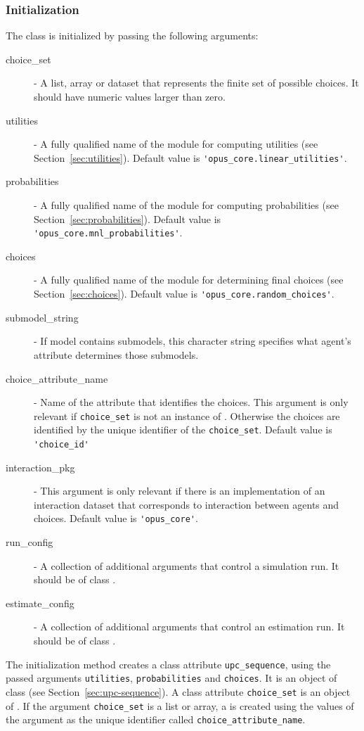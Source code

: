 {\subsubsection{Initialization}
%
The class is initialized by passing the following arguments:
\begin{description}
\item[choice_set] - A list, array or dataset \datasetindex that represents the finite set of
  possible choices. It should have numeric values larger than zero.
\item[utilities] - A fully qualified name of the module for computing utilities
  (see Section~\ref{sec:utilities}). Default value is
  \verb|'opus_core.linear_utilities'|.
\item[probabilities] - A fully qualified name of the module for computing
  probabilities (see Section~\ref{sec:probabilities}). Default value is
  \verb|'opus_core.mnl_probabilities'|.
\item[choices] - A fully qualified name of the module for determining
  final choices (see Section~\ref{sec:choices}). Default value is
  \verb|'opus_core.random_choices'|.
\item[submodel_string] - If model contains submodels, this character string
  specifies what agent's attribute \attributesindex determines those submodels.
\item[choice_attribute_name] - Name of the attribute \attributesindex that identifies the
  choices. This argument is only relevant if \verb|choice_set| is not an
  instance of . \datasetindex Otherwise the choices are identified by the
  unique identifier of the \verb|choice_set|. Default value is
  \verb|'choice_id'|
\item[interaction_pkg] - This argument is only relevant if there is an
  implementation of an interaction dataset that corresponds to interaction
  between agents and choices. Default value is \verb|'opus_core'|.
\item[run_config] - A collection of additional arguments that control a
  simulation run. It should be of class .
\item[estimate_config] - A collection of additional arguments that control an
  estimation run. It should be of class .
\end{description}
The initialization method creates a class attribute \attributesindex \verb|upc_sequence|, using
the passed arguments \verb|utilities|, \verb|probabilities| and
\verb|choices|. It is an object of class  (see
Section~\ref{sec:upc-sequence}). A class attribute \attributesindex \verb|choice_set| is an
object of . \datasetindex If the argument \verb|choice_set| is a list or
array, a  \datasetindex is created using the values of the argument as the
unique identifier called \verb|choice_attribute_name|. \attributesindex

}
